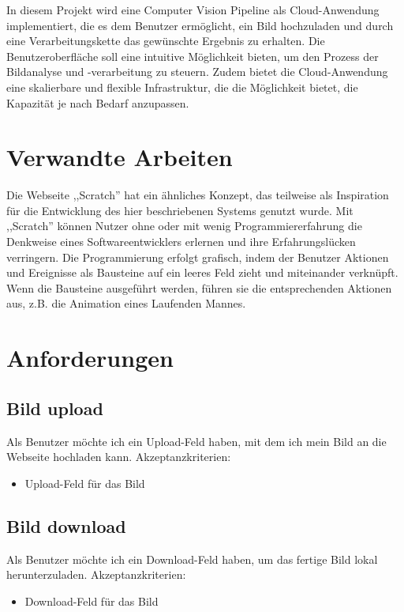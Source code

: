 \documentclass[conference]{IEEEtran}
\begin{document}
In diesem Projekt wird eine Computer Vision Pipeline als Cloud-Anwendung implementiert, die es dem Benutzer ermöglicht, ein Bild hochzuladen und durch eine Verarbeitungskette das gewünschte Ergebnis zu erhalten. Die Benutzeroberfläche soll eine intuitive Möglichkeit bieten, um den Prozess der Bildanalyse und -verarbeitung zu steuern. Zudem bietet die Cloud-Anwendung eine skalierbare und flexible Infrastruktur, die die Möglichkeit bietet, die Kapazität je nach Bedarf anzupassen.

\section{Verwandte Arbeiten}

Die Webseite ,,Scratch” \cite{scratch} hat ein ähnliches Konzept, das teilweise als Inspiration für die Entwicklung des hier beschriebenen Systems genutzt wurde. Mit ,,Scratch” können Nutzer ohne oder mit wenig Programmiererfahrung die Denkweise eines Softwareentwicklers erlernen und ihre Erfahrungslücken verringern. Die Programmierung erfolgt grafisch, indem der Benutzer Aktionen und Ereignisse als Bausteine auf ein leeres Feld zieht und miteinander verknüpft. Wenn die Bausteine ausgeführt werden, führen sie die
entsprechenden Aktionen aus, z.B. die Animation eines Laufenden Mannes.

\section{Anforderungen}

\subsection{Bild upload}
Als Benutzer möchte ich ein Upload-Feld haben, mit dem ich mein Bild an die Webseite hochladen kann.
Akzeptanzkriterien: 
\begin{itemize}
	\item Upload-Feld für das Bild
\end{itemize}

\subsection{Bild download}
Als Benutzer möchte ich ein Download-Feld haben, um das fertige Bild lokal herunterzuladen.
Akzeptanzkriterien: 
\begin{itemize}
	\item Download-Feld für das Bild
\end{itemize}
\end{document}
